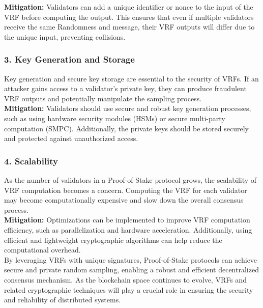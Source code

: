 \noindent
\textbf{Mitigation:} Validators can add a unique identifier or nonce to the input of the VRF before computing the output. This ensures that even if multiple validators receive the same Randomness and message, their VRF outputs will differ due to the unique input, preventing collisions.

\subsubsection{3. Key Generation and Storage}
Key generation and secure key storage are essential to the security of VRFs. If an attacker gains access to a validator's private key, they can produce fraudulent VRF outputs and potentially manipulate the sampling process.\\

\noindent
\textbf{Mitigation:} Validators should use secure and robust key generation processes, such as using hardware security modules (HSMs) or secure multi-party computation (SMPC). Additionally, the private keys should be stored securely and protected against unauthorized access.

\subsubsection{4. Scalability}
As the number of validators in a Proof-of-Stake protocol grows, the scalability of VRF computation becomes a concern. Computing the VRF for each validator may become computationally expensive and slow down the overall consensus process.\\

\noindent
\textbf{Mitigation:} Optimizations can be implemented to improve VRF computation efficiency, such as parallelization and hardware acceleration. Additionally, using efficient and lightweight cryptographic algorithms can help reduce the computational overhead.\\

By leveraging VRFs with unique signatures, Proof-of-Stake protocols can achieve secure and private random sampling, enabling a robust and efficient decentralized consensus mechanism. As the blockchain space continues to evolve, VRFs and related cryptographic techniques will play a crucial role in ensuring the security and reliability of distributed systems.


